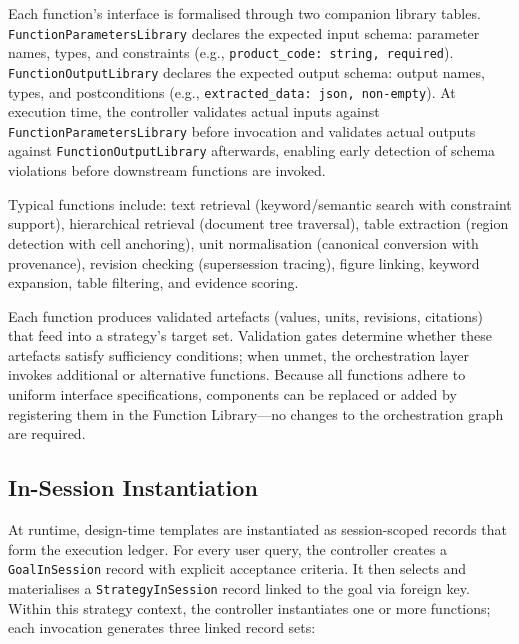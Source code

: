 \documentclass[largeformat]{interact}
\begin{document}
Each function's interface is formalised through two companion library tables. \texttt{FunctionParametersLibrary} declares the expected input schema: parameter names, types, and constraints (e.g., \texttt{product\_code: string, required}). \texttt{FunctionOutputLibrary} declares the expected output schema: output names, types, and postconditions (e.g., \texttt{extracted\_data: json, non-empty}). At execution time, the controller validates actual inputs against \texttt{FunctionParametersLibrary} before invocation and validates actual outputs against \texttt{FunctionOutputLibrary} afterwards, enabling early detection of schema violations before downstream functions are invoked.
 
Typical functions include: text retrieval (keyword/semantic search with constraint support), hierarchical retrieval (document tree traversal), table extraction (region detection with cell anchoring), unit normalisation (canonical conversion with provenance), revision checking (supersession tracing), figure linking, keyword expansion, table filtering, and evidence scoring.
 
Each function produces validated artefacts (values, units, revisions, citations) that feed into a strategy's target set. Validation gates determine whether these artefacts satisfy sufficiency conditions; when unmet, the orchestration layer invokes additional or alternative functions. Because all functions adhere to uniform interface specifications, components can be replaced or added by registering them in the Function Library---no changes to the orchestration graph are required.



\subsection{In-Session Instantiation}
\label{subsec:in-session_instantiation}
At runtime, design-time templates are instantiated as session-scoped records that form the execution ledger. For every user query, the controller creates a \texttt{GoalInSession} record with explicit acceptance criteria. It then selects and materialises a \texttt{StrategyInSession} record linked to the goal via foreign key. Within this strategy context, the controller instantiates one or more functions; each invocation generates three linked record sets:
 
\end{document}
